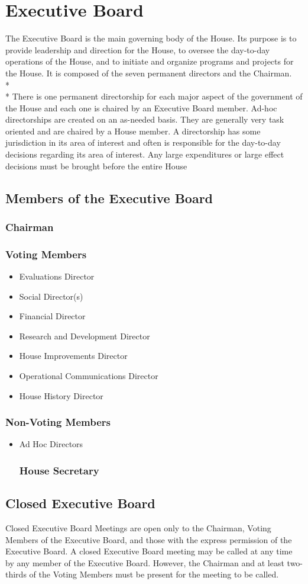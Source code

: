 \documentclass{article}
\newcommand{\article}[1]{\section{#1} \label{#1}}
\newcommand{\asection}[1]{\subsection{#1} \label{#1}}
\newcommand{\asubsection}[1]{\subsubsection{#1} \label{#1}}
\begin{document}
\article{Executive Board}
The Executive Board is the main governing body of the House.
Its purpose is to provide leadership and direction for the House, to oversee the day-to-day operations of the House, and to initiate and organize programs and projects for the House.
It is composed of the seven permanent directors and the Chairman.
\\*\\*
There is one permanent directorship for each major aspect of the government of the House and each one is chaired by an Executive Board member.
Ad-hoc directorships are created on an as-needed basis.
They are generally very task oriented and are chaired by a House member.
A directorship has some jurisdiction in its area of interest and often is responsible for the day-to-day decisions regarding its area of interest.
Any large expenditures or large effect decisions must be brought before the entire House
\asection{Members of the Executive Board}
\asubsection{Chairman}
\asubsection{Voting Members}
\begin{itemize}
	\item Evaluations Director
	\item Social Director(s)
	\item Financial Director
	\item Research and Development Director
	\item House Improvements Director
	\item Operational Communications Director
	\item House History Director
\end{itemize}
\asubsection{Non-Voting Members}
\begin{itemize}
	\item Ad Hoc Directors
\asubsection{House Secretary}
\end{itemize}
\asection{Closed Executive Board}
Closed Executive Board Meetings are open only to the Chairman, Voting Members of the Executive Board, and those with the express permission of the Executive Board.
A closed Executive Board meeting may be called at any time by any member of the Executive Board.
However, the Chairman and at least two-thirds of the Voting Members must be present for the meeting to be called.
\end{document}
